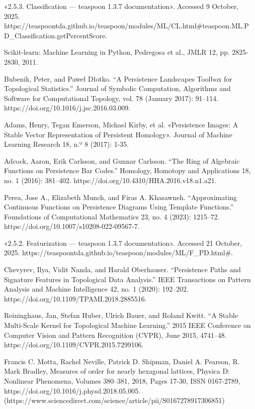 \documentclass{article}
\begin{document}
\begin{thebibliography}{}
     «2.5.3. Classification — teaspoon 1.3.7 documentation». Accessed 9 October, 2025. https://teaspoontda.github.io/teaspoon/modules/ML/CL.html\#teaspoon.ML.P   D\_Classification.getPercentScore.
    
    Scikit-learn: Machine Learning in Python, Pedregosa et al., JMLR 12, pp. 2825-2830, 2011.
   
     Bubenik, Peter, and Paweł Dłotko. “A Persistence Landscapes Toolbox for Topological Statistics.” Journal of Symbolic Computation, Algorithms and Software for Computational Topology, vol. 78 (January 2017): 91–114. https://doi.org/10.1016/j.jsc.2016.03.009.


     Adams, Henry, Tegan Emerson, Michael Kirby, et al. «Persistence Images: A Stable Vector Representation of Persistent Homology». Journal of Machine Learning Research 18, n.º 8 (2017): 1-35.

     Adcock, Aaron, Erik Carlsson, and Gunnar Carlsson. “The Ring of Algebraic Functions on Persistence Bar Codes.” Homology, Homotopy and Applications 18, no. 1 (2016): 381–402. https://doi.org/10.4310/HHA.2016.v18.n1.a21.

     Perea, Jose A., Elizabeth Munch, and Firas A. Khasawneh. “Approximating Continuous Functions on Persistence Diagrams Using Template Functions.” Foundations of Computational Mathematics 23, no. 4 (2023): 1215–72. https://doi.org/10.1007/s10208-022-09567-7.

    «2.5.2. Featurization — teaspoon 1.3.7 documentation». Accessed 21 October, 2025. https://teaspoontda.github.io/teaspoon/modules/ML/F\_PD.html\#.

     Chevyrev, Ilya, Vidit Nanda, and Harald Oberhauser. “Persistence Paths and Signature Features in Topological Data Analysis.” IEEE Transactions on Pattern Analysis and Machine Intelligence 42, no. 1 (2020): 192–202. https://doi.org/10.1109/TPAMI.2018.2885516.

    Reininghaus, Jan, Stefan Huber, Ulrich Bauer, and Roland Kwitt. “A Stable Multi-Scale Kernel for Topological Machine Learning.” 2015 IEEE Conference on Computer Vision and Pattern Recognition (CVPR), June 2015, 4741–48. https://doi.org/10.1109/CVPR.2015.7299106.

   
    Francis C. Motta, Rachel Neville, Patrick D. Shipman, Daniel A. Pearson, R. Mark Bradley,
    Measures of order for nearly hexagonal lattices,
    Physica D: Nonlinear Phenomena,
    Volumes 380–381,
    2018,
    Pages 17-30,
    ISSN 0167-2789,
    https://doi.org/10.1016/j.physd.2018.05.005.
    (https://www.sciencedirect.com/science/article/pii/S0167278917306851)


\end{thebibliography}
\end{document}
